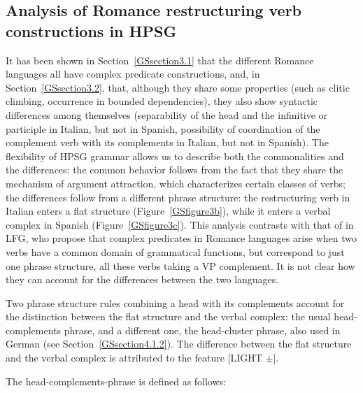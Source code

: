\documentclass[output=paper
                ,modfonts
                ,nonflat
	        ,collection
	        ,collectionchapter
	        ,collectiontoclongg
 	        ,biblatex
                ,babelshorthands
                ,newtxmath
                ,draftmode
                ,colorlinks, citecolor=brown
]{./langsci/langscibook}
\begin{document}
{\subsection{Analysis of Romance restructuring verb constructions in HPSG} \label{GSsection3.3}
\label{sec-romance-complex-predicates}

It has been shown in Section~\ref{GSsection3.1} that the different Romance languages all have complex predicate constructions, and, in Section~\ref{GSsection3.2}, that, although they share some properties (such as clitic climbing, occurrence in bounded dependencies), they also show syntactic differences among themselves (separability of the head and the infinitive or participle in Italian, but not in Spanish, possibility of coordination of the complement verb with its complements in Italian, but not in Spanish). The flexibility of HPSG grammar allows us to describe both the commonalities and the differences: the common behavior follows from the fact that they share the mechanism of argument attraction, which characterizes certain classes of verbs; the differences follow from a different phrase structure: the restructuring verb in Italian enters a flat structure (Figure~\ref{GSfigure3b}), while it enters a verbal complex in Spanish (Figure~\ref{GSfigure3c}). This analysis contrasts with that of \cite{andrews1999complex} in LFG, who propose that complex predicates in Romance languages arise when two verbs have a common domain of grammatical functions, but correspond to just one phrase structure, all these verbs taking a VP complement. It is not clear how they can account for the differences between the two languages.

Two phrase structure rules combining a head with its complements account for the distinction between the flat structure and the verbal complex: the usual head-complements phrase, and a different one, the head-cluster phrase, also used in German (see Section~\ref{GSsection4.1.2}). The difference between the flat structure and the verbal complex is attributed to the feature [LIGHT $\pm$]. 

The head-complements-phrase is defined as follows:

\begin{exe}
\end{exe}


}
\end{document}
